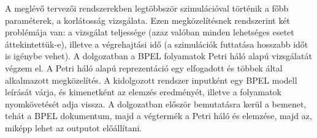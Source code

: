 A meglévő tervezői rendszerekben legtöbbször szimulációval történik a főbb paraméterek, a korlátosság vizsgálata. Ezen megközelítésnek rendszerint két problémája van: a vizsgálat teljessége (azaz valóban minden lehetséges esetet áttekintettük-e), illetve a végrehajtási idő (a szimulációk futtatása hosszabb időt is igénybe vehet).
\newpage
A dolgozatban a BPEL folyamatok Petri háló alapú vizsgálatát végzem el. A Petri háló alapú reprezentáció egy elfogadott és többek által alkalmazott megközelítés. A kidolgozott rendszer inputként egy  BPEL modell leírását várja, és kimenetként az elemzés eredményét, illetve a folyamatok nyomkövetését adja vissza. A dolgozatban először bemutatásra kerül a bemenet, tehát a BPEL dokumentum, majd a végtermék a Petri háló és elemzése, majd az, miképp lehet az outputot előállítani.